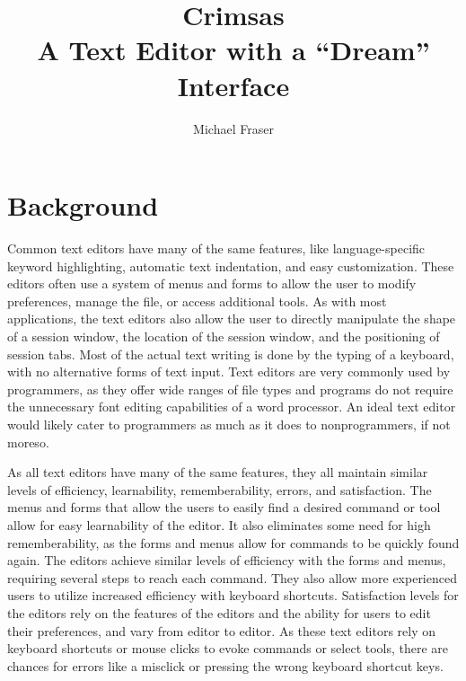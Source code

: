 \documentclass[11pt, oneside]{article}
\begin{document}
\title{Crimsas \\ A Text Editor with a ``Dream'' Interface}
\author{Michael Fraser}
\maketitle

\tableofcontents

\section{Background}
Common text editors have many of the same features, like language-specific keyword highlighting, automatic text indentation, and easy customization. These editors often use a system of menus and forms to allow the user to modify preferences, manage the file, or access additional tools. As with most applications, the text editors also allow the user to directly manipulate the shape of a session window, the location of the session window, and the positioning of session tabs. Most of the actual text writing is done by the typing of a keyboard, with no alternative forms of text input. Text editors are very commonly used by programmers, as they offer wide ranges of file types and programs do not require the unnecessary font editing capabilities of a word processor. An ideal text editor would likely cater to programmers as much as it does to nonprogrammers, if not moreso. 

As all text editors have many of the same features, they all maintain similar levels of efficiency, learnability, rememberability, errors, and satisfaction. The menus and forms that allow the users to easily find a desired command or tool allow for easy learnability of the editor. It also eliminates some need for high rememberability, as the forms and menus allow for commands to be quickly found again. The editors achieve similar levels of efficiency with the forms and menus, requiring several steps to reach each command. They also allow more experienced users to utilize increased efficiency with keyboard shortcuts. Satisfaction levels for the editors rely on the features of the editors and the ability for users to edit their preferences, and vary from editor to editor. As these text editors rely on keyboard shortcuts or mouse clicks to evoke commands or select tools, there are chances for errors like a misclick or pressing the wrong keyboard shortcut keys.
\end{document}
